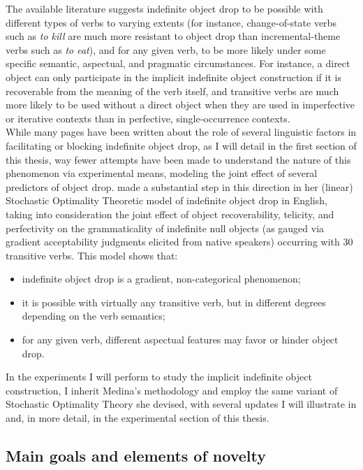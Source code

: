 The available literature suggests indefinite object drop to be possible with different types of verbs to varying extents (for instance, change-of-state verbs such as \textit{to kill} are much more resistant to object drop than incremental-theme verbs such as \textit{to eat}), and for any given verb, to be more likely under some specific semantic, aspectual, and pragmatic circumstances. For instance, a direct object can only participate in the implicit indefinite object construction if it is recoverable from the meaning of the verb itself, and transitive verbs are much more likely to be used without a direct object when they are used in imperfective or iterative contexts than in perfective, single-occurrence contexts.\\
While many pages have been written about the role of several linguistic factors in facilitating or blocking indefinite object drop, as I will detail in the first section of this thesis, way fewer attempts have been made to understand the nature of this phenomenon via experimental means, modeling the joint effect of several predictors of object drop. \textcite{Medina2007} made a substantial step in this direction in her (linear) Stochastic Optimality Theoretic model of indefinite object drop in English, taking into consideration the joint effect of object recoverability, telicity, and perfectivity on the grammaticality of indefinite null objects (as gauged via gradient acceptability judgments elicited from native speakers) occurring with 30 transitive verbs. This model shows that:
\begin{itemize}
    \item indefinite object drop is a gradient, non-categorical phenomenon;
    \item it is possible with virtually any transitive verb, but in different degrees depending on the verb semantics;
    \item for any given verb, different aspectual features may favor or hinder object drop.
\end{itemize}

In the experiments I will perform to study the implicit indefinite object construction, I inherit Medina's methodology and employ the same variant of Stochastic Optimality Theory she devised, with several updates I will illustrate in  and, in more detail, in the experimental section of this thesis.


\subsection{Main goals and elements of novelty} 

